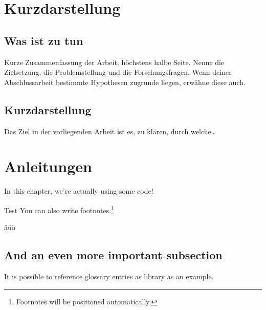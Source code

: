 
\thispagestyle{empty}
\section*{Kurzdarstellung}
\label{sec:kurzdarstellung}

\subsection{Was ist zu tun}
Kurze Zusammenfassung der Arbeit, höchstens halbe Seite.
Nenne die Zielsetzung, die Problemstellung und die Forschungsfragen. Wenn deiner Abschlussarbeit bestimmte Hypothesen zugrunde liegen, erwähne diese auch.


\subsection{Kurzdarstellung}
Das Ziel in der vorliegenden Arbeit ist es, zu klären, durch welche\dots


\section{Anleitungen}
In this chapter, we're actually using some code!




%

Test \cite{Ball2022}
You can also write footnotes.\footnote{Footnotes will be positioned automatically.}

äüö


\subsection{And an even more important subsection}

It is possible to reference glossary entries as \gls{library} as an example.

